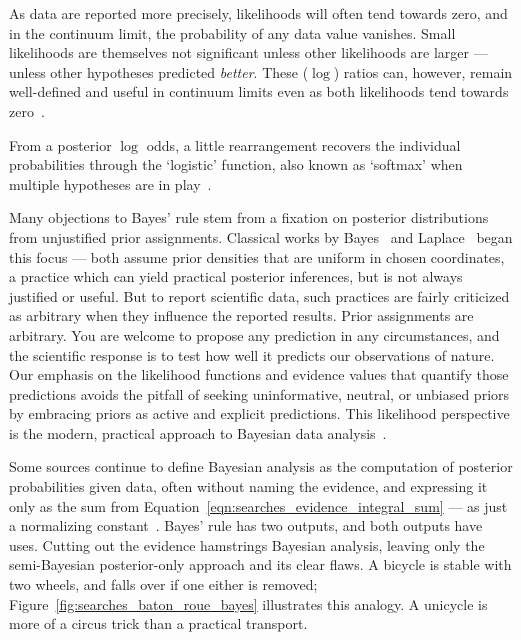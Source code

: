 As data are reported more precisely, likelihoods will often tend towards zero,
and in the continuum limit, the probability of any data value vanishes.
Small likelihoods are themselves not significant unless other likelihoods
are larger --- unless other hypotheses predicted \emph{better}.
These ($\log$) ratios can, however, remain well-defined and useful in continuum
limits even as both likelihoods tend towards
zero~\cite{billingsley2008probability}.

From a posterior $\log$ odds, a little rearrangement recovers the individual
probabilities through the `logistic' function, also known as
`softmax' when multiple hypotheses are in play~\cite{MurphyKevinP.2012Mlap}.

Many objections to Bayes' rule stem from a fixation on posterior
distributions from unjustified prior assignments.
Classical works by
Bayes~\cite{bayes1763lii} and
Laplace~\cite{laplace1774stigler} began this focus ---
both assume prior densities that are uniform in chosen coordinates, a practice
which can yield practical posterior inferences,
but is not always justified or useful.
But to report scientific data, such practices are fairly criticized as
arbitrary when they influence the reported results.
Prior assignments are arbitrary.
You are welcome to propose any prediction in any circumstances, and the
scientific response is to test how well it predicts our observations of nature.
Our emphasis on the likelihood functions and evidence values that quantify
those predictions avoids the pitfall of seeking uninformative, neutral, or
unbiased priors by embracing priors as active and explicit predictions.
This likelihood perspective is the modern, practical approach to Bayesian data
analysis~\cite{
mackay2003information,
skilling2004nested,
skilling2006nested,
sivia2006data,
skilling2010foundations
}.

Some sources continue to define Bayesian analysis as the computation of
posterior probabilities given data, often without naming the evidence, and
expressing it only as the sum from
Equation~\ref{eqn:searches_evidence_integral_sum}
--- as just a normalizing constant~\cite{
Neyman1937Outline,
gelman1995bayesian,
gelman2008objections,
DAgostini:1994fjx,
DAgostini:2010hil,
cowan1998statistical,
pdg2022ynf
}.
Bayes' rule has two outputs, and both outputs have uses.
Cutting out the evidence hamstrings Bayesian analysis, leaving only the
semi-Bayesian posterior-only approach and its clear flaws.
A bicycle is stable with two wheels, and falls over if one either
is removed;
Figure~\ref{fig:searches_baton_roue_bayes} illustrates this analogy.
A unicycle is more of a circus trick than a practical transport.

